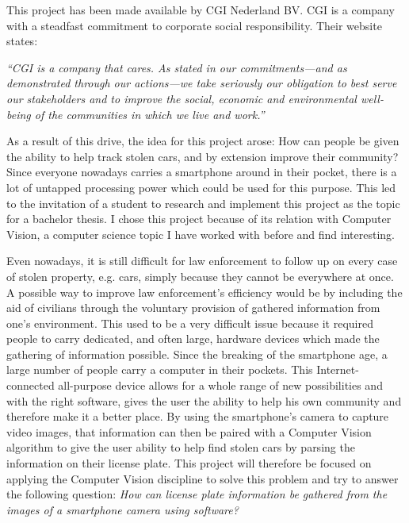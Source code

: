 
This project has been made available by CGI Nederland BV. CGI is a company with a steadfast commitment to corporate social responsibility. Their website states:

\textit{``CGI is a company that cares. As stated in our commitments—and as demonstrated through our actions—we take seriously our obligation to best serve our stakeholders and to improve the social, economic and environmental well-being of the communities in which we live and work.''} \cite{csr-cgi}

As a result of this drive, the idea for this project arose: How can people be given the ability to help track stolen cars, and by extension improve their community? Since everyone nowadays carries a smartphone around in their pocket, there is a lot of untapped processing power which could be used for this purpose. This led to the invitation of a student to research and implement this project as the topic for a bachelor thesis. I chose this project because of its relation with Computer Vision, a computer science topic I have worked with before and find interesting.


Even nowadays, it is still difficult for law enforcement to follow up on every case of stolen property, e.g. cars, simply because they cannot be everywhere at once. A possible way to improve law enforcement's efficiency would be by including the aid of civilians through the voluntary provision of gathered information from one's environment. This used to be a very difficult issue because it required people to carry dedicated, and often large, hardware devices which made the gathering of information possible. Since the breaking of the smartphone age, a large number of people carry a computer in their pockets. This Internet-connected all-purpose device allows for a whole range of new possibilities and with the right software, gives the user the ability to help his own community and therefore make it a better place. By using the smartphone's camera to capture video images, that information can then be paired with a Computer Vision algorithm to give the user ability to help find stolen cars by parsing the information on their license plate. This project will therefore be focused on applying the Computer Vision discipline to solve this problem and try to answer the following question: \textit{How can license plate information be gathered from the images of a smartphone camera using software?}

